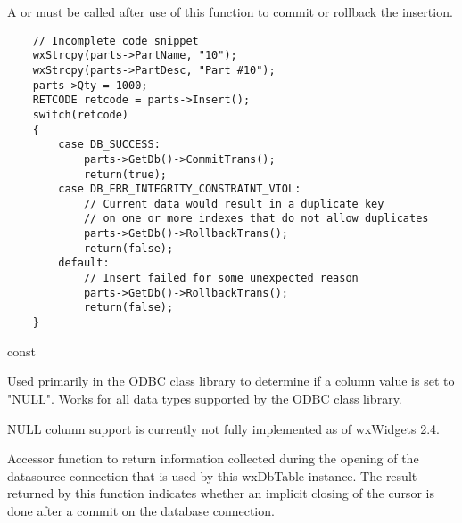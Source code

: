 
A  or
 must be called after use of
this function to commit or rollback the insertion.


\begin{verbatim}
    // Incomplete code snippet
    wxStrcpy(parts->PartName, "10");
    wxStrcpy(parts->PartDesc, "Part #10");
    parts->Qty = 1000;
    RETCODE retcode = parts->Insert();
    switch(retcode)
    {
        case DB_SUCCESS:
            parts->GetDb()->CommitTrans();
            return(true);
        case DB_ERR_INTEGRITY_CONSTRAINT_VIOL:
            // Current data would result in a duplicate key
            // on one or more indexes that do not allow duplicates
            parts->GetDb()->RollbackTrans();
            return(false);
        default:
            // Insert failed for some unexpected reason
            parts->GetDb()->RollbackTrans();
            return(false);
    }
\end{verbatim}

\label{wxdbtableiscolnull}

 const

Used primarily in the ODBC class library to determine if a column value is
set to "NULL".  Works for all data types supported by the ODBC class library.




NULL column support is currently not fully implemented as of wxWidgets 2.4.

\label{wxdbtableiscursorclosedoncommit}


Accessor function to return information collected during the opening of the
datasource connection that is used by this wxDbTable instance.  The result
returned by this function indicates whether an implicit closing of the cursor is
done after a commit on the database connection.

